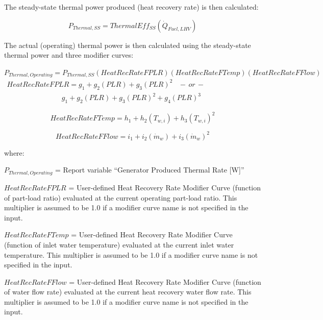 The steady-state thermal power produced (heat recovery rate) is then calculated:

\begin{equation}
{P_{Thermal,SS}} = ThermalEf{f_{SS}}\left( {{{\dot Q}_{Fuel,LHV}}} \right)
\end{equation}

The actual (operating) thermal power is then calculated using the steady-state thermal power and three modifier curves:

\({P_{Thermal,Operating}} = {P_{Thermal,SS}}\left( {HeatRecRateFPLR} \right)\left( {HeatRecRateFTemp} \right)\left( {HeatRecRateFFlow} \right)\) \(\begin{array}{l}HeatRecRateFPLR = {g_1} + {g_2}\left( {PLR} \right) + {g_3}{\left( {PLR} \right)^2}\,\,\,\,\, - \,or\, - \\\,\,\,\,\,\,\,\,\,\,\,\,\,\,\,\,\,\,\,\,\,\,\,\,\,\,\,\,\,\,\,\,\,\,\,\,\,\,\,\,\,\,\,\,\,\,{g_1} + {g_2}\left( {PLR} \right) + {g_3}{\left( {PLR} \right)^2} + {g_4}{\left( {PLR} \right)^3}\end{array}\)

\begin{equation}
HeatRecRateFTemp = {h_1} + {h_2}\left( {{T_{w,i}}} \right) + {h_3}{\left( {{T_{w,i}}} \right)^2}
\end{equation}

\begin{equation}
HeatRecRateFFlow = {i_1} + {i_2}\left( {{{\dot m}_w}} \right) + {i_3}{\left( {{{\dot m}_w}} \right)^2}
\end{equation}

where:

\({P_{Thermal,Operating}}\) = Report variable ``Generator Produced Thermal Rate {[}W{]}''

\(HeatRecRateFPLR\) = User-defined Heat Recovery Rate Modifier Curve (function of part-load ratio) evaluated at the current operating part-load ratio. This multiplier is assumed to be 1.0 if a modifier curve name is not specified in the input.

\(HeatRecRateFTemp\) = User-defined Heat Recovery Rate Modifier Curve (function of inlet water temperature) evaluated at the current inlet water temperature. This multiplier is assumed to be 1.0 if a modifier curve name is not specified in the input.

\(HeatRecRateFFlow\) = User-defined Heat Recovery Rate Modifier Curve (function of water flow rate) evaluated at the current heat recovery water flow rate. This multiplier is assumed to be 1.0 if a modifier curve name is not specified in the input.

